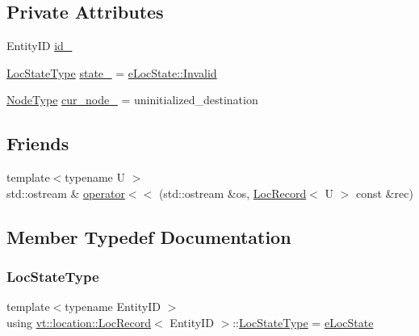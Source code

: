 \subsection*{Private Attributes}
\begin{DoxyCompactItemize}
\item 
Entity\+ID \hyperlink{structvt_1_1location_1_1_loc_record_a165c38a690d7fadd583fa05e9e2b4a25}{id\+\_\+}
\item 
\hyperlink{namespacevt_1_1location_a7a5c74aad68cf57281515029d8521547}{Loc\+State\+Type} \hyperlink{structvt_1_1location_1_1_loc_record_a61f9aee0764759d61b9e3fddebe602cd}{state\+\_\+} = \hyperlink{namespacevt_1_1location_a7a5c74aad68cf57281515029d8521547a4bbb8f967da6d1a610596d7257179c2b}{e\+Loc\+State\+::\+Invalid}
\item 
\hyperlink{namespacevt_a866da9d0efc19c0a1ce79e9e492f47e2}{Node\+Type} \hyperlink{structvt_1_1location_1_1_loc_record_aff7390974f2a2c874bde346db67fac13}{cur\+\_\+node\+\_\+} = uninitialized\+\_\+destination
\end{DoxyCompactItemize}
\subsection*{Friends}
\begin{DoxyCompactItemize}
\item 
{\footnotesize template$<$typename U $>$ }\\std\+::ostream \& \hyperlink{structvt_1_1location_1_1_loc_record_ac94f95ab9e7fa58002314e99696972d7}{operator$<$$<$} (std\+::ostream \&os, \hyperlink{structvt_1_1location_1_1_loc_record}{Loc\+Record}$<$ U $>$ const \&rec)
\end{DoxyCompactItemize}


\subsection{Member Typedef Documentation}
\mbox{\label{structvt_1_1location_1_1_loc_record_a292a4bfaf13edb8d1c2e7a4fdd5421fb}} 
\subsubsection{\texorpdfstring{Loc\+State\+Type}{LocStateType}}
{\footnotesize\ttfamily template$<$typename Entity\+ID $>$ \\
using \hyperlink{structvt_1_1location_1_1_loc_record}{vt\+::location\+::\+Loc\+Record}$<$ Entity\+ID $>$\+::\hyperlink{namespacevt_1_1location_a7a5c74aad68cf57281515029d8521547}{Loc\+State\+Type} =  \hyperlink{namespacevt_1_1location_a7a5c74aad68cf57281515029d8521547}{e\+Loc\+State}}



